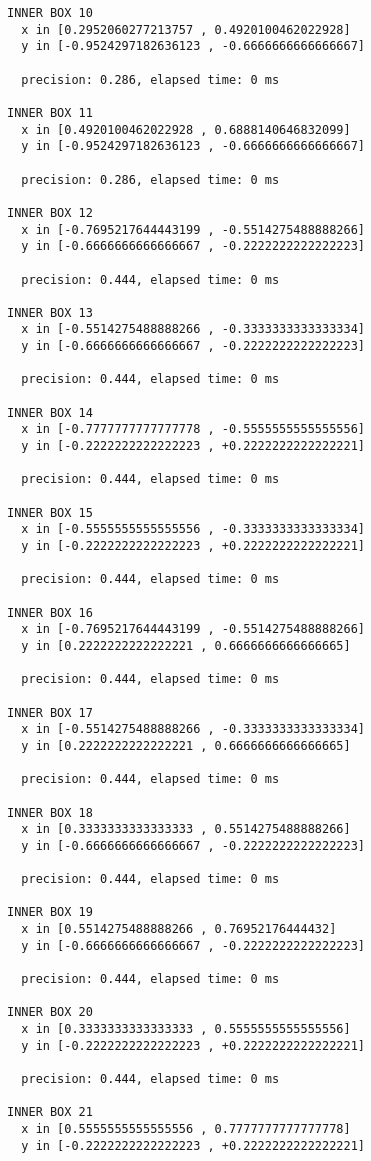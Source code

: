 \begin{verbatim}
INNER BOX 10
  x in [0.2952060277213757 , 0.4920100462022928]
  y in [-0.9524297182636123 , -0.6666666666666667]

  precision: 0.286, elapsed time: 0 ms

INNER BOX 11
  x in [0.4920100462022928 , 0.6888140646832099]
  y in [-0.9524297182636123 , -0.6666666666666667]

  precision: 0.286, elapsed time: 0 ms

INNER BOX 12
  x in [-0.7695217644443199 , -0.5514275488888266]
  y in [-0.6666666666666667 , -0.2222222222222223]

  precision: 0.444, elapsed time: 0 ms

INNER BOX 13
  x in [-0.5514275488888266 , -0.3333333333333334]
  y in [-0.6666666666666667 , -0.2222222222222223]

  precision: 0.444, elapsed time: 0 ms

INNER BOX 14
  x in [-0.7777777777777778 , -0.5555555555555556]
  y in [-0.2222222222222223 , +0.2222222222222221]

  precision: 0.444, elapsed time: 0 ms

INNER BOX 15
  x in [-0.5555555555555556 , -0.3333333333333334]
  y in [-0.2222222222222223 , +0.2222222222222221]

  precision: 0.444, elapsed time: 0 ms

INNER BOX 16
  x in [-0.7695217644443199 , -0.5514275488888266]
  y in [0.2222222222222221 , 0.6666666666666665]

  precision: 0.444, elapsed time: 0 ms

INNER BOX 17
  x in [-0.5514275488888266 , -0.3333333333333334]
  y in [0.2222222222222221 , 0.6666666666666665]

  precision: 0.444, elapsed time: 0 ms

INNER BOX 18
  x in [0.3333333333333333 , 0.5514275488888266]
  y in [-0.6666666666666667 , -0.2222222222222223]

  precision: 0.444, elapsed time: 0 ms

INNER BOX 19
  x in [0.5514275488888266 , 0.76952176444432]
  y in [-0.6666666666666667 , -0.2222222222222223]

  precision: 0.444, elapsed time: 0 ms

INNER BOX 20
  x in [0.3333333333333333 , 0.5555555555555556]
  y in [-0.2222222222222223 , +0.2222222222222221]

  precision: 0.444, elapsed time: 0 ms

INNER BOX 21
  x in [0.5555555555555556 , 0.7777777777777778]
  y in [-0.2222222222222223 , +0.2222222222222221]


\end{verbatim}
